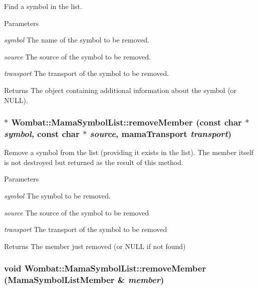 Find a symbol in the list. 
\begin{DoxyParams}{Parameters}
\item[{\em symbol}]The name of the symbol to be removed. \item[{\em source}]The source of the symbol to be removed. \item[{\em transport}]The transport of the symbol to be removed. \end{DoxyParams}
\begin{DoxyReturn}{Returns}
The object containing additional information about the symbol (or NULL). 
\end{DoxyReturn}
\hypertarget{classWombat_1_1MamaSymbolList_a45860e5e044a1945d1b1932d0ef33424}{
\subsubsection[{removeMember}]{$\ast$ Wombat::MamaSymbolList::removeMember (const char $\ast$ {\em symbol}, \/  const char $\ast$ {\em source}, \/  mamaTransport {\em transport})}}
\label{classWombat_1_1MamaSymbolList_a45860e5e044a1945d1b1932d0ef33424}


Remove a symbol from the list (providing it exists in the list). The member itself is not destroyed but returned as the result of this method.


\begin{DoxyParams}{Parameters}
\item[{\em symbol}]The symbol to be removed. \item[{\em source}]The source of the symbol to be removed \item[{\em transport}]The transport of the symbol to be removed \end{DoxyParams}
\begin{DoxyReturn}{Returns}
The member just removed (or NULL if not found) 
\end{DoxyReturn}
\hypertarget{classWombat_1_1MamaSymbolList_a0c10e7ec1de0fbd3b30deb023244485e}{
\subsubsection[{removeMember}]{\setlength{\rightskip}{0pt plus 5cm}void Wombat::MamaSymbolList::removeMember ({\bf MamaSymbolListMember} \& {\em member})}}
\label{classWombat_1_1MamaSymbolList_a0c10e7ec1de0fbd3b30deb023244485e}


